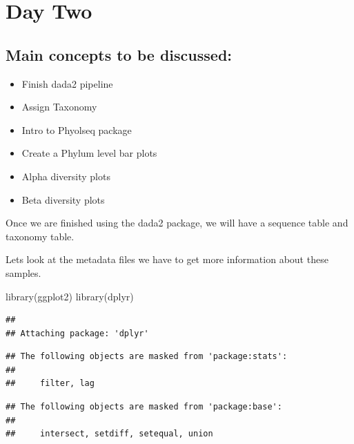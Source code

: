 \documentclass[
]{book}
\newenvironment{Shaded}{\begin{snugshade}}{\end{snugshade}}
\newcommand{\FunctionTok}[1]{\textcolor[rgb]{0.00,0.00,0.00}{#1}}
\newcommand{\NormalTok}[1]{#1}
\providecommand{\tightlist}{%
  \setlength{\itemsep}{0pt}\setlength{\parskip}{0pt}}
\begin{document}
\hypertarget{day-two}{%
\chapter{Day Two}\label{day-two}}

\hypertarget{main-concepts-to-be-discussed}{%
\section{Main concepts to be discussed:}\label{main-concepts-to-be-discussed}}

\begin{itemize}
\tightlist
\item
  Finish dada2 pipeline
\item
  Assign Taxonomy
\item
  Intro to Phyolseq package
\item
  Create a Phylum level bar plots
\item
  Alpha diversity plots
\item
  Beta diversity plots
\end{itemize}

Once we are finished using the dada2 package, we will have a sequence table and taxonomy table.

Lets look at the metadata files we have to get more information about these samples.

\begin{Shaded}
\begin{Highlighting}[]
\FunctionTok{library}\NormalTok{(ggplot2)}
\FunctionTok{library}\NormalTok{(dplyr)}
\end{Highlighting}
\end{Shaded}

\begin{verbatim}
## 
## Attaching package: 'dplyr'
\end{verbatim}

\begin{verbatim}
## The following objects are masked from 'package:stats':
## 
##     filter, lag
\end{verbatim}

\begin{verbatim}
## The following objects are masked from 'package:base':
## 
##     intersect, setdiff, setequal, union
\end{verbatim}
\end{document}
